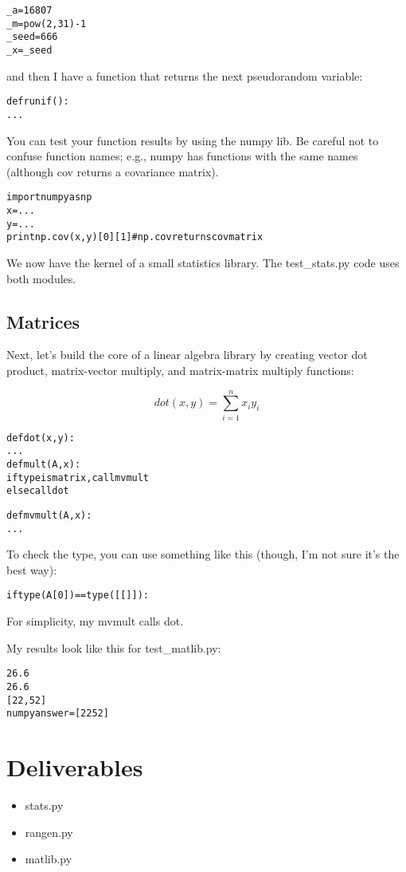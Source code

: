 \begin{fullwidth}
\begin{alltt}
_a = 16807
_m = pow(2,31)-1
_seed = 666
_x = _seed
\end{alltt}

\noindent and then I have a function that returns the next pseudorandom variable:
 
\begin{alltt}
 def runif():
     ...
\end{alltt}

You can test your function results by using the numpy lib. Be careful not to confuse function names; e.g., numpy has functions with the same names (although cov returns a covariance matrix).

\begin{alltt}
import numpy as np
x = ...
y = ...
print np.cov(x,y)[0][1] # np.cov returns cov matrix
\end{alltt}

We now have the kernel of a small statistics library.  The test\_stats.py code uses both modules.

\subsection{Matrices}

Next, let's build the core of a linear algebra library by creating vector dot product, matrix-vector multiply, and matrix-matrix multiply functions:

\[\tag{Dot product}
dot(x,y) = \sum_{i=1}^n x_i y_i
\]
\begin{alltt}
def dot(x,y):
    ...
def mult(A,x):
    if type is matrix, call mvmult
    else call dot
	
def mvmult(A,x):
    ...
\end{alltt}

To check the type, you can use something like this (though, I'm not sure it's the best way):

\begin{alltt}
if type(A[0]) == type([[]]):
\end{alltt}

For simplicity, my mvmult calls dot.

My results look like this for test\_matlib.py:

\begin{alltt}
26.6
26.6
[22, 52]
numpy answer = [22 52]
\end{alltt}

\section{Deliverables}

\begin{itemize}
\item stats.py
\item rangen.py
\item matlib.py
\end{itemize}

\end{fullwidth}


